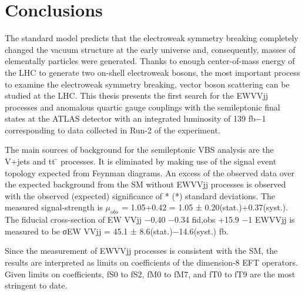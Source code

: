 \chapter{Conclusions}

The standard model predicts that the electroweak symmetry breaking completely changed the vacuum structure at the early universe and, consequently, masses of elementally particles were generated. Thanks to enough center-of-mass energy of the LHC to generate two on-shell electroweak bosons, the most important process to examine the electroweak symmetry breaking, vector boson scattering can be studied at the LHC. This thesis presents the first search for the EWVVjj processes and anomalous quartic gauge couplings with the semileptonic final states at the ATLAS detector with an integrated luminosity of 139 fb−1 corresponding to data collected in Run-2 of the experiment.

The main sources of background for the semileptonic VBS analysis are the V+jets and tt ̄ processes. It is eliminated by making use of the signal event topology expected from Feynman diagrams. 
An excess of the observed data over the expected background from the SM without EWVVjj processes is observed with the observed (expected) significance of * (*) standard deviations. The measured
signal-strength is $μ_{obs}$ = 1.05+0.42 = 1.05 ± 0.20(stat.)+0.37(syst.). The fiducial cross-section of EW VVjj −0.40 −0.34
fid,obs +15.9 −1 EWVVjj is measured to be σEW VVjj = 45.1 ± 8.6(stat.)−14.6(syst.) fb.

Since the measurement of EWVVjj processes is consistent with the SM, the results are interpreted as limits on coefficients of the dimension-8 EFT operators. Given limits on coefficients, fS0 to fS2, fM0 to fM7, and fT0 to fT9 are the most stringent to date.
